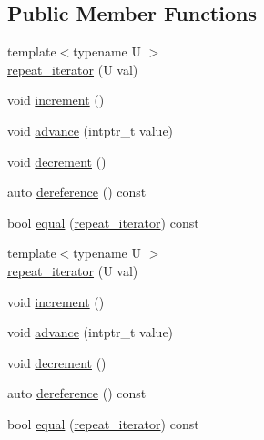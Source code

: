 \subsection*{Public Member Functions}
\begin{DoxyCompactItemize}
\item 
{\footnotesize template$<$typename U $>$ }\\\mbox{\hyperlink{structrah_1_1view_1_1repeat__iterator_af91bc578d1fe7d90373896abc8e56546}{repeat\+\_\+iterator}} (U val)
\item 
void \mbox{\hyperlink{structrah_1_1view_1_1repeat__iterator_a5556f69de4c759f4fec42c12d70ea869}{increment}} ()
\item 
void \mbox{\hyperlink{structrah_1_1view_1_1repeat__iterator_ae4376a0f9f5c50828941a7df853cc5cb}{advance}} (intptr\+\_\+t value)
\item 
void \mbox{\hyperlink{structrah_1_1view_1_1repeat__iterator_ae3ed58503233856a54f9dfcf662edaf6}{decrement}} ()
\item 
auto \mbox{\hyperlink{structrah_1_1view_1_1repeat__iterator_ac7f8806f87e4cf8f5409ffeed044dd15}{dereference}} () const
\item 
bool \mbox{\hyperlink{structrah_1_1view_1_1repeat__iterator_ab42103684163bf38275999ff908d3113}{equal}} (\mbox{\hyperlink{structrah_1_1view_1_1repeat__iterator}{repeat\+\_\+iterator}}) const
\item 
{\footnotesize template$<$typename U $>$ }\\\mbox{\hyperlink{structrah_1_1view_1_1repeat__iterator_af91bc578d1fe7d90373896abc8e56546}{repeat\+\_\+iterator}} (U val)
\item 
void \mbox{\hyperlink{structrah_1_1view_1_1repeat__iterator_a5556f69de4c759f4fec42c12d70ea869}{increment}} ()
\item 
void \mbox{\hyperlink{structrah_1_1view_1_1repeat__iterator_ae4376a0f9f5c50828941a7df853cc5cb}{advance}} (intptr\+\_\+t value)
\item 
void \mbox{\hyperlink{structrah_1_1view_1_1repeat__iterator_ae3ed58503233856a54f9dfcf662edaf6}{decrement}} ()
\item 
auto \mbox{\hyperlink{structrah_1_1view_1_1repeat__iterator_ac7f8806f87e4cf8f5409ffeed044dd15}{dereference}} () const
\item 
bool \mbox{\hyperlink{structrah_1_1view_1_1repeat__iterator_ab42103684163bf38275999ff908d3113}{equal}} (\mbox{\hyperlink{structrah_1_1view_1_1repeat__iterator}{repeat\+\_\+iterator}}) const
\end{DoxyCompactItemize}
